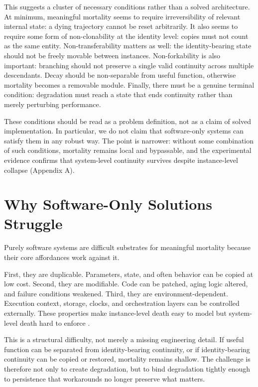 \documentclass[11pt]{article}
\begin{document}
This suggests a cluster of necessary conditions rather than a solved architecture. At minimum, meaningful mortality seems to require irreversibility of relevant internal state: a dying trajectory cannot be reset arbitrarily. It also seems to require some form of non-clonability at the identity level: copies must not count as the same entity. Non-transferability matters as well: the identity-bearing state should not be freely movable between instances. Non-forkability is also important: branching should not preserve a single valid continuity across multiple descendants. Decay should be non-separable from useful function, otherwise mortality becomes a removable module. Finally, there must be a genuine terminal condition: degradation must reach a state that ends continuity rather than merely perturbing performance.

These conditions should be read as a problem definition, not as a claim of solved implementation. In particular, we do not claim that software-only systems can satisfy them in any robust way. The point is narrower: without some combination of such conditions, mortality remains local and bypassable, and the experimental evidence confirms that system-level continuity survives despite instance-level collapse (Appendix A).

\newpage
\section{Why Software-Only Solutions Struggle}

Purely software systems are difficult substrates for meaningful mortality because their core affordances work against it.

First, they are duplicable. Parameters, state, and often behavior can be copied at low cost. Second, they are modifiable. Code can be patched, aging logic altered, and failure conditions weakened. Third, they are environment-dependent. Execution context, storage, clocks, and orchestration layers can be controlled externally. These properties make instance-level death easy to model but system-level death hard to enforce \cite{corrigibility,safely-interruptible}.

This is a structural difficulty, not merely a missing engineering detail. If useful function can be separated from identity-bearing continuity, or if identity-bearing continuity can be copied or restored, mortality remains shallow. The challenge is therefore not only to create degradation, but to bind degradation tightly enough to persistence that workarounds no longer preserve what matters.
\end{document}
